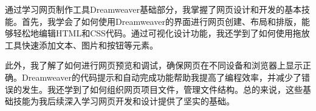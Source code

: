 \documentclass[supercite]{Experimental_Report}
\theoremstyle{definition}
\begin{document}
通过学习网页制作工具Dreamweaver基础部分，我掌握了网页设计和开发的基本技能。首先，我学会了如何使用Dreamweaver的界面进行网页创建、布局和排版，能够轻松地编辑HTML和CSS代码。通过可视化设计功能，我还学到了如何使用拖放工具快速添加文本、图片和按钮等元素。

此外，我了解了如何进行网页预览和调试，确保网页在不同设备和浏览器上显示正确。Dreamweaver的代码提示和自动完成功能帮助我提高了编程效率，并减少了错误的发生。我还学到了如何组织网页项目文件，管理文件结构。总的来说，这些基础技能为我后续深入学习网页开发和设计提供了坚实的基础。


\nocite{*} %

%
%
\end{document}
